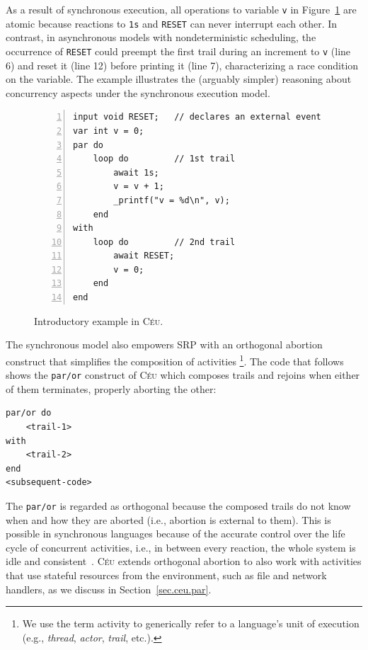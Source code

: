 \documentclass{acm_proc_article-sp}
\newcommand{\CEU}{\textsc{C\'{e}u}\xspace}
\newcommand{\code}[1] {{\small{\texttt{#1}}}}
\newcommand{\1}{\;}
\newcommand{\2}{\;\;}
\newcommand{\3}{\;\;\;}
\newcommand{\5}{\;\;\;\;\;}
\begin{document}
As a result of synchronous execution, all operations to variable \code{v} in 
Figure~\ref{lst.intro} are atomic because reactions to \code{1s} and 
\code{RESET} can never interrupt each other.
%
In contrast, in asynchronous models with nondeterministic scheduling, the 
occurrence of \code{RESET} could preempt the first trail during an increment to 
\code{v} (line 6) and reset it (line 12) before printing it (line 7), 
characterizing a race condition on the variable.
%
The example illustrates the (arguably simpler) reasoning about concurrency 
aspects under the synchronous execution model.

\begin{figure}[t]
\begin{lstlisting}[numbers=left,xleftmargin=3em]
input void RESET;   // declares an external event
var int v = 0;
par do
    loop do         // 1st trail
        await 1s;
        v = v + 1;
        _printf("v = %d\n", v);
    end
with
    loop do         // 2nd trail
        await RESET;
        v = 0;
    end
end
\end{lstlisting}
\caption{ Introductory example in \CEU.
\label{lst.intro}
}
\end{figure}


The synchronous model also empowers SRP with an orthogonal abortion construct 
that simplifies the composition of activities%
\footnote{We use the term activity to generically refer to a language's unit of 
execution (e.g., \emph{thread}, \emph{actor}, \emph{trail}, etc.).}.
%
%
The code that follows shows the \code{par/or} construct of \CEU which composes 
trails and rejoins when either of them terminates, properly aborting the other:

\begin{lstlisting}
par/or do
    <trail-1>
with
    <trail-2>
end
<subsequent-code>
\end{lstlisting}

The \code{par/or} is regarded as orthogonal because the composed trails do not 
know when and how they are aborted (i.e., abortion is external to them).
%
This is possible in synchronous languages because of the accurate control over 
the life cycle of concurrent activities, i.e., in between every reaction, the 
whole system is idle and consistent~\cite{esterel.preemption}.
%
\CEU extends orthogonal abortion to also work with activities that use stateful 
resources from the environment, such as file and network handlers, as we 
discuss in Section~\ref{sec.ceu.par}.
\end{document}
